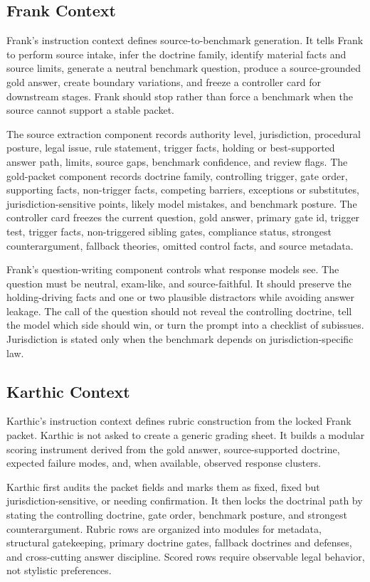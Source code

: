 \subsection{Frank Context}

Frank's instruction context defines source-to-benchmark generation. It tells
Frank to perform source intake, infer the doctrine family, identify material
facts and source limits, generate a neutral benchmark question, produce a
source-grounded gold answer, create boundary variations, and freeze a controller
card for downstream stages. Frank should stop rather than force a benchmark when
the source cannot support a stable packet.

The source extraction component records authority level, jurisdiction,
procedural posture, legal issue, rule statement, trigger facts, holding or
best-supported answer path, limits, source gaps, benchmark confidence, and
review flags. The gold-packet component records doctrine family, controlling
trigger, gate order, supporting facts, non-trigger facts, competing barriers,
exceptions or substitutes, jurisdiction-sensitive points, likely model mistakes,
and benchmark posture. The controller card freezes the current question, gold
answer, primary gate id, trigger test, trigger facts, non-triggered sibling
gates, compliance status, strongest counterargument, fallback theories, omitted
control facts, and source metadata.

Frank's question-writing component controls what response models see. The
question must be neutral, exam-like, and source-faithful. It should preserve the
holding-driving facts and one or two plausible distractors while avoiding answer
leakage. The call of the question should not reveal the controlling doctrine,
tell the model which side should win, or turn the prompt into a checklist of
subissues. Jurisdiction is stated only when the benchmark depends on
jurisdiction-specific law.

\subsection{Karthic Context}

Karthic's instruction context defines rubric construction from the locked Frank
packet. Karthic is not asked to create a generic grading sheet. It builds a
modular scoring instrument derived from the gold answer, source-supported
doctrine, expected failure modes, and, when available, observed response
clusters.

Karthic first audits the packet fields and marks them as fixed, fixed but
jurisdiction-sensitive, or needing confirmation. It then locks the doctrinal path
by stating the controlling doctrine, gate order, benchmark posture, and strongest
counterargument. Rubric rows are organized into modules for metadata, structural
gatekeeping, primary doctrine gates, fallback doctrines and defenses, and
cross-cutting answer discipline. Scored rows require observable legal behavior,
not stylistic preferences.

